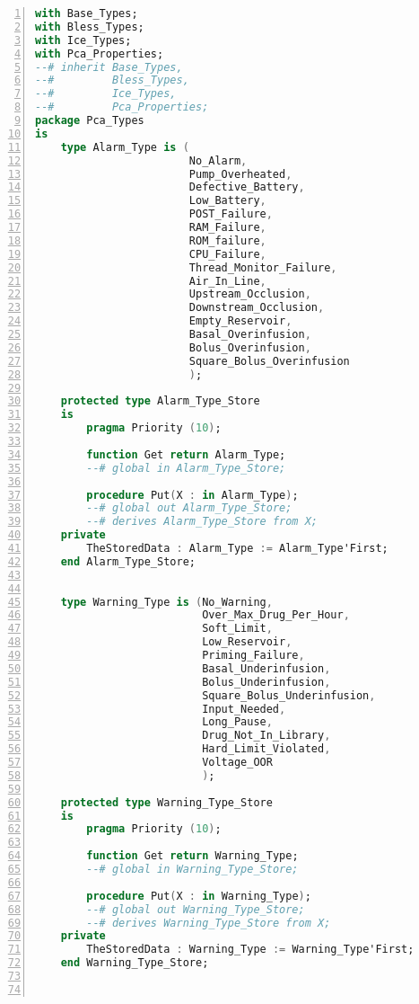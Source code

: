 \singlespacing
\begin{lstlisting}[language=ada, gobble=0, numbers=left, caption={\lstinline{Pca_Types} package}, label={listing:pca_generated:pca_types}]
with Base_Types;
with Bless_Types;
with Ice_Types;
with Pca_Properties;
--# inherit Base_Types,
--#         Bless_Types,
--#         Ice_Types,
--#         Pca_Properties;
package Pca_Types
is
    type Alarm_Type is (
                        No_Alarm,
                        Pump_Overheated,
                        Defective_Battery,
                        Low_Battery,
                        POST_Failure,
                        RAM_Failure,
                        ROM_failure,
                        CPU_Failure,
                        Thread_Monitor_Failure,
                        Air_In_Line,
                        Upstream_Occlusion,
                        Downstream_Occlusion,
                        Empty_Reservoir,
                        Basal_Overinfusion,
                        Bolus_Overinfusion,
                        Square_Bolus_Overinfusion
                        );

    protected type Alarm_Type_Store
    is
        pragma Priority (10);

        function Get return Alarm_Type;
        --# global in Alarm_Type_Store;

        procedure Put(X : in Alarm_Type);
        --# global out Alarm_Type_Store;
        --# derives Alarm_Type_Store from X;
    private
        TheStoredData : Alarm_Type := Alarm_Type'First;
    end Alarm_Type_Store;


    type Warning_Type is (No_Warning,
                          Over_Max_Drug_Per_Hour,
                          Soft_Limit,
                          Low_Reservoir,
                          Priming_Failure,
                          Basal_Underinfusion,
                          Bolus_Underinfusion,
                          Square_Bolus_Underinfusion,
                          Input_Needed,
                          Long_Pause,
                          Drug_Not_In_Library,
                          Hard_Limit_Violated,
                          Voltage_OOR
                          );

    protected type Warning_Type_Store
    is
        pragma Priority (10);

        function Get return Warning_Type;
        --# global in Warning_Type_Store;

        procedure Put(X : in Warning_Type);
        --# global out Warning_Type_Store;
        --# derives Warning_Type_Store from X;
    private
        TheStoredData : Warning_Type := Warning_Type'First;
    end Warning_Type_Store;



\end{lstlisting}
